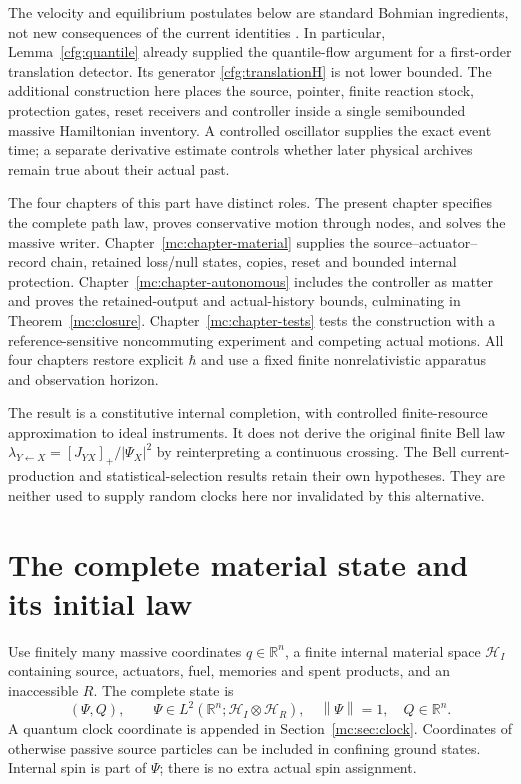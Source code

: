 \documentclass[11pt,oneside,openany]{book}
\theoremstyle{definition}
\theoremstyle{remark}\newtheorem{remark}[theorem]{Remark}
\providecommand{\norm}[1]{\left\lVert#1\right\rVert}
\providecommand{\mcH}{\mathcal H}
\begin{document}
The velocity and equilibrium postulates below are standard Bohmian
ingredients, not new consequences of the current identities
\cite{mc:BohmI,mc:BohmII,mc:DGZeq,mc:DGZoperators}. In particular,
Lemma~\ref{cfg:quantile} already supplied the quantile-flow argument for a
first-order translation detector. Its generator
\eqref{cfg:translationH} is not lower bounded. The additional construction
here places the source, pointer, finite reaction stock, protection gates,
reset receivers and controller inside a single semibounded massive
Hamiltonian inventory. A controlled oscillator supplies the exact event
time; a separate derivative estimate controls whether later physical
archives remain true about their actual past.

The four chapters of this part have distinct roles. The present chapter
specifies the complete path law, proves conservative motion through nodes,
and solves the massive writer. Chapter~\ref{mc:chapter-material} supplies
the source--actuator--record chain, retained loss/null states, copies, reset
and bounded internal protection. Chapter~\ref{mc:chapter-autonomous}
includes the controller as matter and proves the retained-output and
actual-history bounds, culminating in Theorem~\ref{mc:closure}.
Chapter~\ref{mc:chapter-tests} tests the construction with a
reference-sensitive noncommuting experiment and competing actual motions.
All four chapters restore explicit $\hbar$ and use a fixed finite
nonrelativistic apparatus and observation horizon.

The result is a constitutive internal completion, with controlled
finite-resource approximation to ideal instruments. It does not derive
the original finite Bell law
$\lambda_{Y\leftarrow X}=[J_{YX}]_+/|\Psi_X|^2$ by reinterpreting a
continuous crossing. The Bell current-production and statistical-selection
results retain their own hypotheses. They are neither used to supply
random clocks here nor invalidated by this alternative.

\section{The complete material state and its initial law}
\label{mc:sec:constitution}
Use finitely many massive coordinates $q\in\mathbb R^n$, a finite internal material space $\mcH_I$ containing source, actuators, fuel, memories and spent products, and an inaccessible $R$. The complete state is
\begin{equation}\label{mc:eq:state}
 (\Psi,Q),\qquad \Psi\in L^2(\mathbb R^n;\mcH_I\otimes\mcH_R),\quad
 \norm{\Psi}=1,\quad Q\in\mathbb R^n.
\end{equation}
A quantum clock coordinate is appended in Section~\ref{mc:sec:clock}. Coordinates of otherwise passive source particles can be included in confining ground states. Internal spin is part of $\Psi$; there is no extra actual spin assignment.
\end{document}
